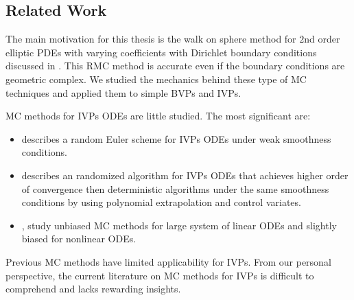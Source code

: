 \documentclass[a4paper,12pt]{article}
\begin{document}
\subsection{Related Work}
The main motivation for this thesis is the walk on sphere method for $2$nd order elliptic PDEs
with varying coefficients with Dirichlet boundary conditions
discussed in \cite{sawhney_grid-free_2022}. This RMC method
is accurate even if the boundary conditions are geometric complex. We studied the
mechanics behind these type of MC techniques and applied them to simple BVPs and IVPs.

\begin{related}
    MC methods for IVPs ODEs are little studied. The most significant are:
    \begin{itemize}
        \item \cite{jentzen_random_2009} describes a random Euler scheme for IVPs ODEs under
              weak smoothness conditions.

        \item \cite{daun_randomized_2011} describes an randomized algorithm for IVPs ODEs that
              achieves higher order of convergence then deterministic algorithms under the
              same smoothness conditions by using polynomial extrapolation and control variates.

        \item \cite{ermakov_monte_2019}, \cite{ermakov_monte_2021} study unbiased MC methods
              for large system of linear ODEs and slightly biased for nonlinear ODEs.
    \end{itemize}

    Previous MC methods have limited applicability for IVPs.
    From our personal perspective, the current literature on
    MC methods for IVPs is difficult to comprehend and lacks
    rewarding insights.

\end{related}


\end{document}
